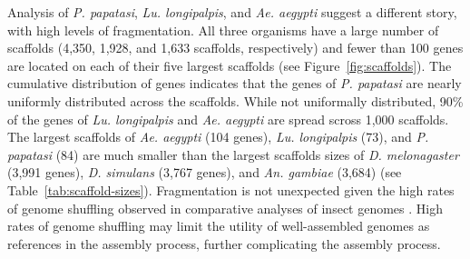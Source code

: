 Analysis of \emph{P. papatasi}, \emph{Lu. longipalpis}, and \emph{Ae. aegypti} suggest a different story, with high levels of fragmentation.  All three organisms have a large number of scaffolds (4,350, 1,928, and 1,633 scaffolds, respectively) and fewer than 100 genes are located on each of their five largest scaffolds (see Figure~\ref{fig:scaffolds}).  The cumulative distribution of genes indicates that the genes of \emph{P. papatasi} are nearly uniformly distributed across the scaffolds.  While not uniformally distributed, 90\% of the genes of \emph{Lu. longipalpis} and \emph{Ae. aegypti} are spread scross 1,000 scaffolds. The largest scaffolds of \emph{Ae. aegypti} (104 genes), \emph{Lu. longipalpis} (73), and \emph{P. papatasi} (84) are much smaller than the largest scaffolds sizes of \emph{D. melonagaster} (3,991 genes), \emph{D. simulans} (3,767 genes), and \emph{An. gambiae} (3,684) (see Table~\ref{tab:scaffold-sizes}). Fragmentation is not unexpected given the high rates of genome shuffling observed in comparative analyses of insect genomes \cite{Zdobnov2007,Ranz2001}.  High rates of genome shuffling may limit the utility of well-assembled genomes as references in the assembly process, further complicating the assembly process.


